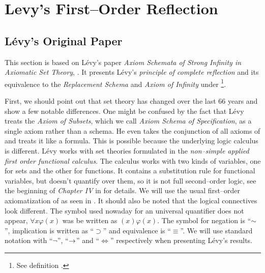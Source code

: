 \section{Levy's First–Order Reflection}\label{sec:first_order}

\subsection{Lévy's Original Paper}\label{sec:levy1960}
This section is based on Lévy's paper \emph{Axiom Schemata of Strong Infinity in Axiomatic Set Theory}, \cite{Levy60a}. It presents Lévy's \emph{principle of complete reflection}%
 and its equivalence to the \emph{Replacement Schema} and \emph{Axiom of Infinity} under \footnote{See definition .}.

First, we should point out that set theory has changed over the last 66 years and show a few notable differences.
One might be confused by the fact that Lévy treats the \emph{Axiom of Subsets}, which we call \emph{Axiom Schema of Specification}, as a single axiom rather than a schema. He even takes the conjunction of all axioms of  and treats it like a formula. This is possible because the underlying logic calculus is different. Lévy works with set theories formulated in the \emph{non–simple applied first order functional calculus}. The calculus works with two kinds of variables, one for sets and the other for functions. It contains a substitution rule for functional variables, but doesn't quantify over them, so it is not full second–order logic, see the beginning of \emph{Chapter IV} in \cite{church1996introduction} for details.%
We will use the usual first–order axiomatization of  as seen in \cite{JechBook}.
It should also be noted that the logical connectives look different. The symbol used nowaday for an universal quantifier does not appear, $\forall x \varphi (x)$ was be written as $(x) \varphi (x)$.
The symbol for negation is ``$\sim$'', implication is written as ``$\supset$'' and equivalence is ``$\equiv$''. We will use standard notation with ``$\neg$'', ``$\rightarrow$'' and ``$\iff$'' respectively when presenting Lévy's results.

